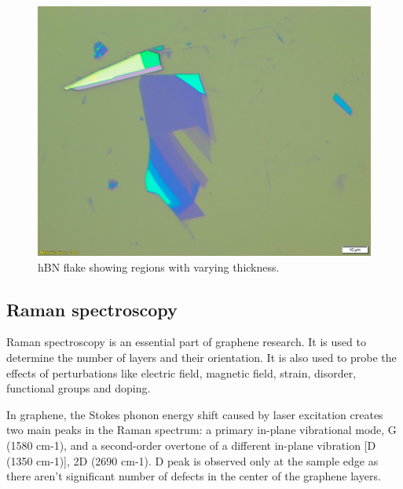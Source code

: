 \begin{figure}[H]
	\centering
	\includegraphics[width=0.6\linewidth]{figures/thickness.jpg}
	\caption{hBN flake showing regions with varying thickness.}
	\label{fig:thickness}
\end{figure}

\subsection{Raman spectroscopy}

Raman spectroscopy is an essential part of graphene research. It is used to determine the number of layers and their orientation. It is also used to probe the effects of perturbations like electric field, magnetic field, strain, disorder, functional groups and doping. 

In graphene, the Stokes phonon energy shift caused by laser excitation creates two main peaks in the Raman spectrum: a primary in-plane vibrational mode, G (1580 cm-1), and a second-order overtone of a different in-plane vibration [D (1350 cm-1)], 2D (2690 cm-1). \cite{Wang_2014} D peak is observed only at the sample edge as there aren't significant number of defects in the center of the graphene layers. \cite{Ferr}

